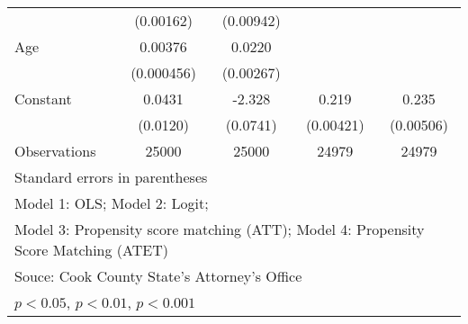 {\begin{tabular}{l*{4}{c}}
                    &   (0.00162)         &   (0.00942)         &                     &                     \\
\addlinespace
Age                 &     0.00376\sym{***}&      0.0220\sym{***}&                     &                     \\
                    &  (0.000456)         &   (0.00267)         &                     &                     \\
\addlinespace
Constant            &      0.0431\sym{***}&      -2.328\sym{***}&       0.219\sym{***}&       0.235\sym{***}\\
                    &    (0.0120)         &    (0.0741)         &   (0.00421)         &   (0.00506)         \\
\midrule
Observations        &       25000         &       25000         &       24979         &       24979         \\
\bottomrule
\multicolumn{5}{l}{\footnotesize Standard errors in parentheses}\\
\multicolumn{5}{l}{\footnotesize Model 1: OLS; Model 2: Logit;}\\
\multicolumn{5}{l}{\footnotesize Model 3: Propensity score matching (ATT); Model 4: Propensity Score Matching (ATET)}\\
\multicolumn{5}{l}{\footnotesize Souce: Cook County State's Attorney's Office}\\
\multicolumn{5}{l}{\footnotesize \sym{*} \(p<0.05\), \sym{**} \(p<0.01\), \sym{***} \(p<0.001\)}\\
\end{tabular}
}
